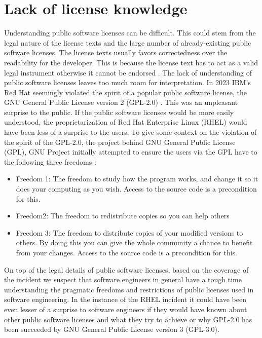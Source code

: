\section{Lack of license knowledge}
Understanding public software licenses can be difficult. This could stem from the legal nature of the license texts and the large number of already-existing public software licenses. The license texts usually favors correctedness over the readability for the developer. This is because the license text has to act as a valid legal instrument otherwise it cannot be endorsed \citep{ferguson2006gpl}. The lack of understanding of public software licenses leaves too much room for interpretation. In 2023 IBM's Red Hat seemingly violated the spirit of a popular public software license, the GNU General Public License version 2 (GPL-2.0) \citep{ibm:rhel, sfc:rhel}. This was an unpleasant surprise to the public. If the public software licenses would be more easily understood, the proprietarization of Red Hat Enterprise Linux (RHEL) would have been less of a surprise to the users. To give some context on the violation of the spirit of the GPL-2.0, the project behind GNU General Public License (GPL), GNU Project initially attempted to ensure the users via the GPL have to the following three freedoms \citep{gnu:free}:
\begin{itemize}
	\item Freedom 1:	The freedom to study how the program works, and change it so it does your computing as you wish. Access to the source code is a precondition for this.
	\item Freedom2: The freedom to redistribute copies so you can help others
	\item Freedom 3:	The freedom to distribute copies of your modified versions to others. By doing this you can give the whole community a chance to benefit from your changes. Access to the source code is a precondition for this.
\end{itemize}

On top of the legal details of public software licenses, based on the coverage of the incident we suspect that software engineers in general have a tough time understanding the pragmatic freedoms and restrictions of public licenses used in software engineering. In the instance of the RHEL incident it could have been even lesser of a surprise to software engineers if they would have known about other public software licenses and what they try to achieve or why GPL-2.0 has been succeeded by GNU General Public License version 3 (GPL-3.0).

